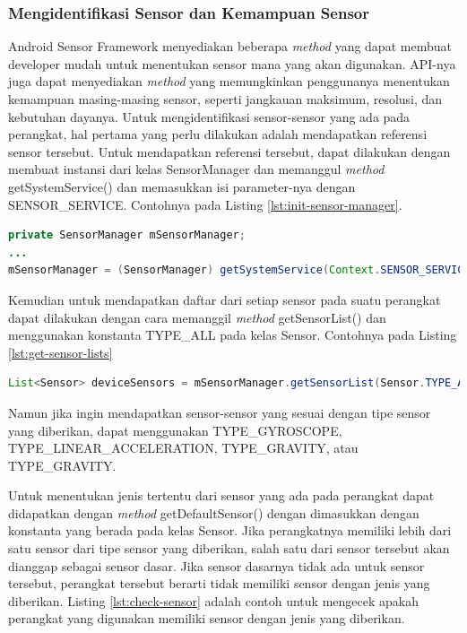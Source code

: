 \subsubsection{Mengidentifikasi Sensor dan Kemampuan Sensor}
\label{sssec:mengidentifikasi_sensor_dan_kapabilitas_sensor}
Android Sensor Framework menyediakan beberapa \textit{method} yang dapat membuat developer mudah untuk menentukan sensor mana yang akan digunakan. API-nya juga dapat menyediakan \textit{method} yang memungkinkan penggunanya menentukan kemampuan masing-masing sensor, seperti jangkauan maksimum, resolusi, dan kebutuhan dayanya.
Untuk mengidentifikasi sensor-sensor yang ada pada perangkat, hal pertama yang perlu dilakukan adalah mendapatkan referensi sensor tersebut. Untuk mendapatkan referensi tersebut, dapat dilakukan dengan membuat instansi dari kelas SensorManager dan memanggul \textit{method} getSystemService() dan memasukkan isi parameter-nya dengan SENSOR\_SERVICE. Contohnya pada Listing \ref{lst:init-sensor-manager}.
 
\begin{lstlisting}[caption={Contoh inisialisasi kelas SensorManager},label={lst:init-sensor-manager},language=java]
private SensorManager mSensorManager;
...
mSensorManager = (SensorManager) getSystemService(Context.SENSOR_SERVICE);
\end{lstlisting}

Kemudian untuk mendapatkan daftar dari setiap sensor pada suatu perangkat dapat dilakukan dengan cara memanggil \textit{method} getSensorList() dan menggunakan konstanta TYPE\_ALL pada kelas Sensor. Contohnya pada Listing \ref{lst:get-sensor-lists}

\begin{lstlisting}[caption={Contoh untuk mendapatkan daftar dari setiap sensor yang ada},label={lst:get-sensor-lists},language=java]
List<Sensor> deviceSensors = mSensorManager.getSensorList(Sensor.TYPE_ALL);
\end{lstlisting}

Namun jika ingin mendapatkan sensor-sensor yang sesuai dengan tipe sensor yang diberikan, dapat menggunakan TYPE\_GYROSCOPE, TYPE\_LINEAR\_ACCELERATION, TYPE\_GRAVITY, atau TYPE\_GRAVITY.

Untuk menentukan jenis tertentu dari sensor yang ada pada perangkat dapat didapatkan dengan \textit{method} getDefaultSensor() dengan dimasukkan dengan konstanta yang berada pada kelas Sensor. Jika perangkatnya memiliki lebih dari satu sensor dari tipe sensor yang diberikan, salah satu dari sensor tersebut akan dianggap sebagai sensor dasar. Jika sensor dasarnya tidak ada untuk sensor tersebut, perangkat tersebut berarti tidak memiliki sensor dengan jenis yang diberikan. Listing \ref{lst:check-sensor} adalah contoh untuk mengecek apakah perangkat yang digunakan memiliki sensor dengan jenis yang diberikan.

